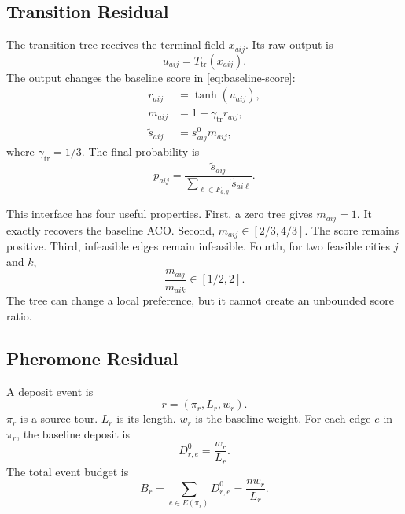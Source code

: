 \documentclass[letterpaper,journal]{IEEEtran}
\begin{document}
\subsection{Transition Residual}

The transition tree receives the terminal field \(x_{aij}\).
Its raw output is
\begin{equation}
    u_{aij}=T_{\mathrm{tr}}(x_{aij}).
\end{equation}
The output changes the baseline score in \eqref{eq:baseline-score}:
\begin{align}
    r_{aij} &= \tanh(u_{aij}),\\
    m_{aij} &= 1+\gamma_{\mathrm{tr}}r_{aij},\\
    \widetilde{s}_{aij} &= s^0_{aij}m_{aij},
    \label{eq:transition-residual}
\end{align}
where \(\gamma_{\mathrm{tr}}=1/3\).
The final probability is
\begin{equation}
    p_{aij}
    =
    \frac{\widetilde{s}_{aij}}
    {\sum_{\ell\in F_{a,q}}\widetilde{s}_{ai\ell}}.
\end{equation}

This interface has four useful properties.
First, a zero tree gives \(m_{aij}=1\).
It exactly recovers the baseline ACO.
Second, \(m_{aij}\in[2/3,4/3]\).
The score remains positive.
Third, infeasible edges remain infeasible.
Fourth, for two feasible cities \(j\) and \(k\),
\begin{equation}
    \frac{m_{aij}}{m_{aik}}\in[1/2,2].
\end{equation}
The tree can change a local preference, but it cannot create an unbounded score ratio.

\subsection{Pheromone Residual}

A deposit event is
\begin{equation}
    r=(\pi_r,L_r,w_r).
\end{equation}
\(\pi_r\) is a source tour.
\(L_r\) is its length.
\(w_r\) is the baseline weight.
For each edge \(e\) in \(\pi_r\), the baseline deposit is
\begin{equation}
    D^0_{r,e}=\frac{w_r}{L_r}.
\end{equation}
The total event budget is
\begin{equation}
    B_r=\sum_{e\in E(\pi_r)}D^0_{r,e}
       =\frac{nw_r}{L_r}.
\end{equation}
\end{document}
